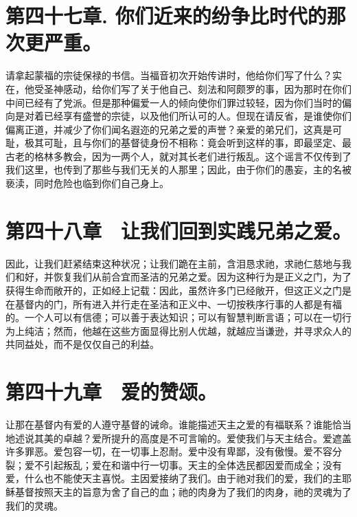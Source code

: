 
\section{第四十七章. 你们近来的纷争比时代的那次更严重。}

请拿起蒙福的宗徒保禄的书信。当福音初次开始传讲时，他给你们写了什么？实在，他受圣神感动，给你们写了关于他自己、刻法和阿颇罗的事，因为那时在你们中间已经有了党派。但是那种偏爱一人的倾向使你们罪过较轻，因为你们当时的偏向是对着已经享有盛誉的宗徒，以及他们所认可的人。但现在请反省，是谁使你们偏离正道，并减少了你们闻名遐迩的兄弟之爱的声誉？亲爱的弟兄们，这真是可耻，极其可耻，且与你们的基督徒身份不相称：竟会听到这样的事，即最坚定、最古老的格林多教会，因为一两个人，就对其长老们进行叛乱。这个谣言不仅传到了我们这里，也传到了那些与我们无关的人那里；因此，由于你们的愚妄，主的名被亵渎，同时危险也临到你们自己身上。\par


\section{第四十八章　让我们回到实践兄弟之爱。}

因此，让我们赶紧结束这种状况；让我们跪在主前，含泪恳求祂，求祂仁慈地与我们和好，并恢复我们从前合宜而圣洁的兄弟之爱。因为这种行为是正义之门，为了获得生命而敞开的，正如经上记载：因此，虽然许多门已经敞开，但这正义之门是在基督内的门，所有进入并行走在圣洁和正义中、一切按秩序行事的人都是有福的。一个人可以有信德；可以善于表达知识；可以有智慧判断言语；可以在一切行为上纯洁；然而，他越在这些方面显得比别人优越，就越应当谦逊，并寻求众人的共同益处，而不是仅仅自己的利益。\par


\section{第四十九章　爱的赞颂。}

让那在基督内有爱的人遵守基督的诫命。谁能描述天主之爱的有福联系？谁能恰当地述说其美的卓越？爱所提升的高度是不可言喻的。爱使我们与天主结合。爱遮盖许多罪恶。爱包容一切，在一切事上忍耐。爱中没有卑鄙，没有傲慢。爱不容分裂；爱不引起叛乱；爱在和谐中行一切事。天主的全体选民都因爱而成全；没有爱，什么也不能使天主喜悦。主因爱接纳了我们。由于祂对我们的爱，我们的主耶稣基督按照天主的旨意为舍了自己的血；祂的肉身为了我们的肉身，祂的灵魂为了我们的灵魂。\par

